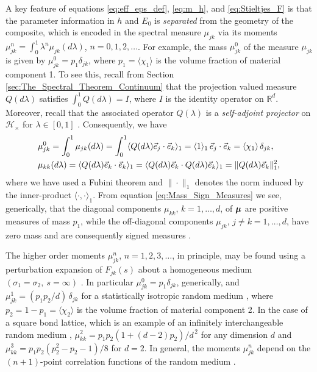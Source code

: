 \documentclass{cmslatex}
\newcommand\bmu{\mbox{\boldmath${\mu}$}}
\begin{document}
A key feature of equations \eqref{eq:eff_eps_def}, \eqref{eq:m_h}, and
\eqref{eq:Stieltjes_F} is that the parameter information in $h$ and
$E_0$ is \emph{separated} from the geometry of the composite, which is
encoded in the spectral measure $\mu_{jk}$ via its moments 
$\mu_{jk}^n=\int_0^1\lambda^n\mu_{jk}(d\lambda)$, $n=0,1,2,\ldots$. For example, the mass
$\mu_{jk}^0$ of the measure $\mu_{jk}$ is given by $\mu_{jk}^0=p_1\delta_{jk}$,
where $p_1=\langle\chi_1\rangle$ is the volume fraction of material component 1.  To
see this, recall from Section \ref{sec:The_Spectral_Theorem_Continuum}
that the projection valued measure $Q(d\lambda)$ satisfies
$\int_0^1Q(d\lambda)=I$, where $I$ is the identity operator on
$\mathbb{R}^d$. Moreover, recall that the associated operator $Q(\lambda)$ 
is a \emph{self-adjoint projector} on $\mathscr{H}_\times$ for $\lambda\in[0,1]$
\cite{Reed-1980,Stone:64}. Consequently, 
we have 
% 
\begin{align}\label{eq:Mass_Sign_Measures}
   &\mu_{jk}^0=\int_0^1\mu_{jk}(d\lambda)=\int_0^1\langle Q(d\lambda)\vec{e}_j\cdot\vec{e}_k\rangle_1
        =\langle1\rangle_1\,\vec{e}_j\cdot\vec{e}_k
        =\langle\chi_1\rangle\,\delta_{jk},\\
   &\mu_{kk}(d\lambda)=\langle Q(d\lambda)\vec{e}_k\cdot\vec{e}_k\rangle_1
       =\langle Q(d\lambda)\vec{e}_k\cdot Q(d\lambda)\vec{e}_k\rangle_1
       =\|Q(d\lambda)\vec{e}_k\|_1^2,\notag
\end{align}
%
where we have used a Fubini theorem \cite{Folland:99}
and $\|\cdot\|_1$ denotes the norm induced by the inner-product
$\langle\cdot,\cdot\rangle_1$. From equation \eqref{eq:Mass_Sign_Measures} we see,
generically, that the diagonal components $\mu_{kk}$, $k=1,\ldots,d$, of
$\bmu$ are positive measures of mass $p_1$, while the off-diagonal
components $\mu_{jk}$, $j\neq k=1,\ldots,d$, have zero mass and are consequently
signed measures \cite{Folland:99,Rudin:87}.



The higher order moments $\mu_{jk}^n$, $n=1,2,3,\ldots$, in principle, may be
found using a perturbation expansion of $F_{jk}(s)$ about a
homogeneous medium $(\sigma_1=\sigma_2, \ s=\infty)$ \cite{Golden:CMP-473}. In
particular $\mu_{jk}^0=p_1\delta_{jk}$, generically, and $\mu_{jk}^1=(p_1p_2/d)\,\delta_{jk}$
for a statistically isotropic random medium 
\cite{Golden:CMP-473,Golden:IMA-97,Bruno:JSP-365}, where
$p_2=1-p_1=\langle\chi_2\rangle$ is the volume fraction of material component 2. In
the case of a square bond lattice, which is an example of an
infinitely interchangeable random medium \cite{Bruno:JSP-365},
$\mu_{kk}^2=p_1p_2(1+(d-2)p_2)/d^{\,2}$ for any dimension $d$ and
$\mu_{kk}^3=p_1p_2(p_2^2-p_2-1)/8$ for $d=2$. In general, the moments
$\mu_{jk}^n$ depend on the $(n+1)$-point correlation functions of the
random medium \cite{Golden:CMP-473,Bruno:JSP-365}.
\end{document}
